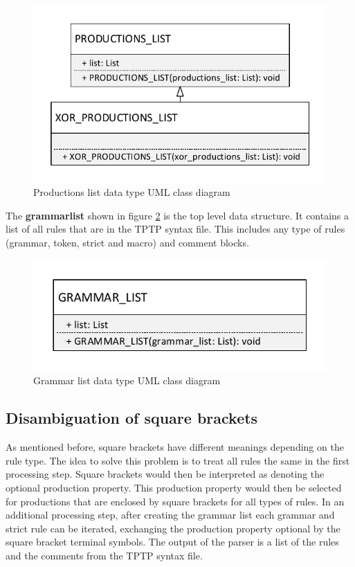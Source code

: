 \begin{figure}[H]
\centering
\includegraphics[width=.6\textwidth]{images/Concept_uml_data_types_productions_list.pdf}
\caption{Productions list data type UML class diagram}
\label{fig:ConceptProductionsListClassDiagram}
\end{figure}


The \textbf{grammar\textunderscore list} shown in figure \ref{fig:ConceptGrammarListClassDiagram} is the top level data structure. It contains a list of all rules that are in the TPTP syntax file.
This includes any type of rules (grammar, token, strict and macro) and comment blocks. 

\begin{figure}[H]
\centering
\includegraphics[width=.5\textwidth]{images/Concept_uml_data_types_grammar_list.pdf}
\caption{Grammar list data type UML class diagram}
\label{fig:ConceptGrammarListClassDiagram}
\end{figure}

\subsection{Disambiguation of  square brackets}\label{sec:ConceptDisambiguation}
As mentioned before, square brackets have different meanings depending on the rule type.
The idea to solve this problem is to treat all rules the same in the first processing step.
Square brackets would then be interpreted as denoting the optional production property.
This production property would then be selected for productions that are enclosed by square brackets for all types of rules.
In an additional processing step, after creating the grammar list each grammar and strict rule can be iterated, exchanging the production property optional by the square bracket terminal symbols.
The output of the parser is a list of the rules and the comments from the \ac{TPTP} syntax file.

